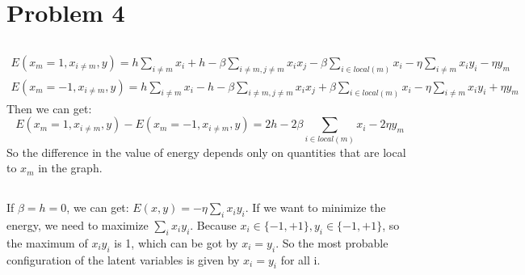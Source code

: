 \documentclass[twoside]{article}
\begin{document}
\section{Problem 4}
\subsection{}
\begin{align*}
E(x_m=1, x_{i \neq m}, y) =  h\sum_{i\neq m}x_i + h -\beta \sum_{i\neq m, j\neq m}x_i x_j - \beta \sum_{i\in local(m)}x_i- \eta \sum_{i\neq m}x_iy_i - \eta y_m\\
E(x_m=-1, x_{i \neq m}, y) =  h\sum_{i\neq m}x_i - h -\beta \sum_{i\neq m, j\neq m}x_i x_j + \beta \sum_{i\in local(m)}x_i- \eta \sum_{i\neq m}x_iy_i + \eta y_m
\end{align*}
Then we can get:
$$E(x_m=1, x_{i \neq m}, y)  - E(x_m=-1, x_{i \neq m}, y) = 2h - 2\beta \sum_{i\in local(m)}x_i - 2\eta y_m$$
So the difference in the value of energy depends only on quantities that are local to $x_m$ in the graph.

\subsection{}
If $\beta = h = 0 $, we can get: $E(x,y) = - \eta \sum_i x_i y_i$. If we want to minimize the energy, we need to maximize $\sum_i x_iy_i$.
Because $x_i \in \{-1, +1\}, y_i \in\{-1, +1\}$, so the maximum of $x_iy_i$ is 1, which can be got by $x_i = y_i$. 
So the most probable configuration of the latent variables is given by $x_i = y_i$ for all i.
\end{document}
